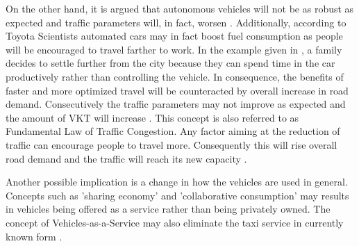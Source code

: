 \documentclass[11pt,english]{article}
\begin{document}
On the other hand, it is argued that autonomous vehicles will not be as robust as expected and traffic parameters will, in fact, worsen \citep{sivak2015road}. Additionally, according to Toyota Scientists \citep{toyota1} automated cars may in fact boost fuel consumption as people will be encouraged to travel farther to work. In the example given in \citet{litman2014autonomous}, a family decides to settle further from the city because they can spend time in the car productively rather than controlling the vehicle. In consequence, the benefits of faster and more optimized travel will be counteracted by overall increase in road demand. Consecutively the traffic parameters may not improve as expected and the amount of VKT will increase \citep{litman2014autonomous}. This concept is also referred to as Fundamental Law of Traffic Congestion. Any factor aiming at the reduction of traffic can encourage people to travel more. Consequently this will rise overall road demand and the traffic will reach its new capacity \citep{duranton2011fundamental}.

\par
Another possible implication is a change in how the vehicles are used in general. Concepts such as 'sharing economy' and 'collaborative consumption' may results in vehicles being offered as a service rather than being privately owned. The concept of Vehicles-as-a-Service may also eliminate the taxi service in currently known form  \citep{levinson2015climbing}.

















\end{document}
